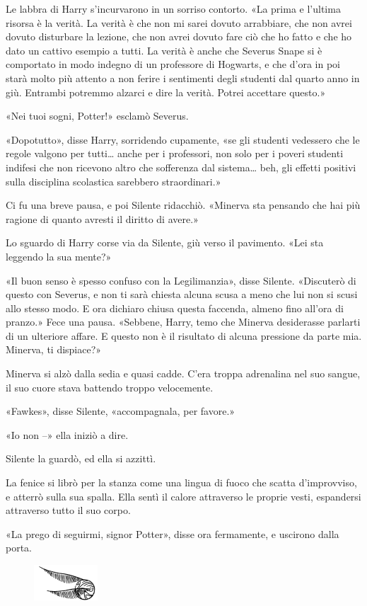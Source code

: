 Le labbra di Harry s’incurvarono in un sorriso contorto. «La prima e l’ultima risorsa è la verità. La verità è che non mi sarei dovuto arrabbiare, che non avrei dovuto disturbare la lezione, che non avrei dovuto fare ciò che ho fatto e che ho dato un cattivo esempio a tutti. La verità è anche che Severus Snape si è comportato in modo indegno di un professore di Hogwarts, e che d’ora in poi starà molto più attento a non ferire i sentimenti degli studenti dal quarto anno in giù. Entrambi potremmo alzarci e dire la verità. Potrei accettare questo.»

«Nei tuoi sogni, Potter!» esclamò Severus.

«Dopotutto», disse Harry, sorridendo cupamente, «se gli studenti vedessero che le regole valgono per tutti… anche per i professori, non solo per i poveri studenti indifesi che non ricevono altro che sofferenza dal sistema… beh, gli effetti positivi sulla disciplina scolastica sarebbero straordinari.»

Ci fu una breve pausa, e poi Silente ridacchiò. «Minerva sta pensando che hai più ragione di quanto avresti il diritto di avere.»

Lo sguardo di Harry corse via da Silente, giù verso il pavimento. «Lei sta leggendo la sua mente?»

«Il buon senso è spesso confuso con la Legilimanzia», disse Silente. «Discuterò di questo con Severus, e non ti sarà chiesta alcuna scusa a meno che lui non si scusi allo stesso modo. E ora dichiaro chiusa questa faccenda, almeno fino all’ora di pranzo.» Fece una pausa. «Sebbene, Harry, temo che Minerva desiderasse parlarti di un ulteriore affare. E questo non è il risultato di alcuna pressione da parte mia. Minerva, ti dispiace?»

Minerva si alzò dalla sedia e quasi cadde. C’era troppa adrenalina nel suo sangue, il suo cuore stava battendo troppo velocemente.

«Fawkes», disse Silente, «accompagnala, per favore.»

«Io non –» ella iniziò a dire.

Silente la guardò, ed ella si azzittì.

La fenice si librò per la stanza come una lingua di fuoco che scatta d’improvviso, e atterrò sulla sua spalla. Ella sentì il calore attraverso le proprie vesti, espandersi attraverso tutto il suo corpo.

«La prego di seguirmi, signor Potter», disse ora fermamente, e uscirono dalla porta.

\begin{figure}[h!]
        \includegraphics[scale=0.4]{boccino.png}
        \centering
\end{figure}

